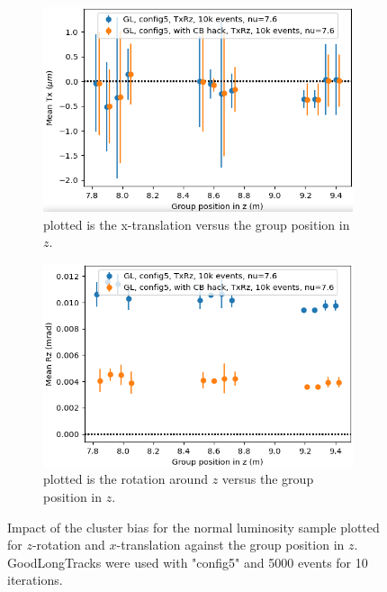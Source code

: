 \begin{figure}
  \centering
  \begin{subfigure}[b]{0.48\textwidth}
    \centering
    \includegraphics[width=\textwidth]{plots/renewed_plots/e5/4_19_1.png}
    \caption{plotted is the x-translation versus the group position in $z$.}
    \label{fig:cbTxlow}
  \end{subfigure}
  \hfill
  \begin{subfigure}[b]{0.48\textwidth}
    \centering
    \includegraphics[width=\textwidth]{plots/renewed_plots/e5/4_19_2.png}
    \caption{plotted is the rotation around $z$ versus the group position in $z$.}
    \label{fig:cbRzlow}
  \end{subfigure}
  \caption{Impact of the cluster bias for the normal luminosity sample plotted for $z$-rotation and $x$-translation against the group position in $z$. GoodLongTracks were used with "config5" and 5000 events for 10 iterations.}
  \label{fig:cbnormal}
\end{figure}

